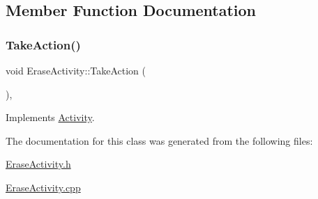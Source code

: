 \subsection{Member Function Documentation}
\mbox{\label{class_erase_activity_a3d5533cbfa19a18a58bb77a5e9daf586}} 
\subsubsection{\texorpdfstring{TakeAction()}{TakeAction()}}
{\footnotesize\ttfamily void Erase\+Activity\+::\+Take\+Action (\begin{DoxyParamCaption}{ }\end{DoxyParamCaption})\hspace{0.3cm}{\ttfamily [override]}, {\ttfamily [virtual]}}



Implements \mbox{\hyperlink{class_activity_af1bed13c5ae595ee7940dee2d34f7989}{Activity}}.



The documentation for this class was generated from the following files\+:\begin{DoxyCompactItemize}
\item 
\mbox{\hyperlink{_erase_activity_8h}{Erase\+Activity.\+h}}\item 
\mbox{\hyperlink{_erase_activity_8cpp}{Erase\+Activity.\+cpp}}\end{DoxyCompactItemize}
